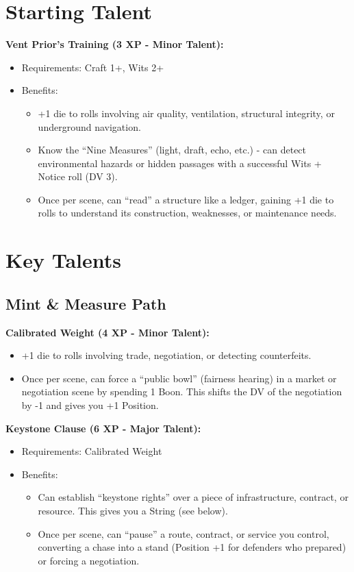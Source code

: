 \documentclass[11pt]{article}
\newcommand{\talent}[1]{\textbf{#1}}
\begin{document}
\section*{Starting Talent}
\talent{Vent Prior's Training (3 XP - Minor Talent):}
\begin{itemize}
  \item Requirements: Craft 1+, Wits 2+
  \item Benefits: 
    \begin{itemize}
      \item +1 die to rolls involving air quality, ventilation, structural integrity, or underground navigation.
      \item Know the ``Nine Measures'' (light, draft, echo, etc.) - can detect environmental hazards or hidden passages with a successful Wits + Notice roll (DV 3).
      \item Once per scene, can ``read'' a structure like a ledger, gaining +1 die to rolls to understand its construction, weaknesses, or maintenance needs.
    \end{itemize}
\end{itemize}

\section*{Key Talents}

\subsection*{Mint \& Measure Path}
\talent{Calibrated Weight (4 XP - Minor Talent):}
\begin{itemize}
  \item +1 die to rolls involving trade, negotiation, or detecting counterfeits.
  \item Once per scene, can force a ``public bowl'' (fairness hearing) in a market or negotiation scene by spending 1 Boon. This shifts the DV of the negotiation by -1 and gives you +1 Position.
\end{itemize}

\talent{Keystone Clause (6 XP - Major Talent):}
\begin{itemize}
  \item Requirements: Calibrated Weight
  \item Benefits: 
    \begin{itemize}
      \item Can establish ``keystone rights'' over a piece of infrastructure, contract, or resource. This gives you a String (see below).
      \item Once per scene, can ``pause'' a route, contract, or service you control, converting a chase into a stand (Position +1 for defenders who prepared) or forcing a negotiation.
    \end{itemize}
\end{itemize}
\end{document}
